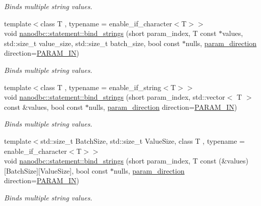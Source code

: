 \begin{DoxyCompactItemize}
\begin{DoxyCompactList}\small\item\em Binds multiple string values. \end{DoxyCompactList}\item 
{\footnotesize template$<$class T , typename  = enable\+\_\+if\+\_\+character$<$\+T$>$$>$ }\\void \mbox{\hyperlink{group__bind__strings_gadfdbae0cd7e7bf3737715bd32904438c}{nanodbc\+::statement\+::bind\+\_\+strings}} (short param\+\_\+index, T const $\ast$values, std\+::size\+\_\+t value\+\_\+size, std\+::size\+\_\+t batch\+\_\+size, bool const $\ast$nulls, \mbox{\hyperlink{classnanodbc_1_1statement_a523142f53cbbee8d68a074da993e7fa6}{param\+\_\+direction}} direction=\mbox{\hyperlink{classnanodbc_1_1statement_a523142f53cbbee8d68a074da993e7fa6ae33f42ce0677d00c291ff4d8e39f99de}{P\+A\+R\+A\+M\+\_\+\+IN}})
\begin{DoxyCompactList}\small\item\em Binds multiple string values. \end{DoxyCompactList}\item 
{\footnotesize template$<$class T , typename  = enable\+\_\+if\+\_\+string$<$\+T$>$$>$ }\\void \mbox{\hyperlink{group__bind__strings_ga7cc7255e38df32cedd8e50f86512a9a8}{nanodbc\+::statement\+::bind\+\_\+strings}} (short param\+\_\+index, std\+::vector$<$ T $>$ const \&values, bool const $\ast$nulls, \mbox{\hyperlink{classnanodbc_1_1statement_a523142f53cbbee8d68a074da993e7fa6}{param\+\_\+direction}} direction=\mbox{\hyperlink{classnanodbc_1_1statement_a523142f53cbbee8d68a074da993e7fa6ae33f42ce0677d00c291ff4d8e39f99de}{P\+A\+R\+A\+M\+\_\+\+IN}})
\begin{DoxyCompactList}\small\item\em Binds multiple string values. \end{DoxyCompactList}\item 
{\footnotesize template$<$std\+::size\+\_\+t Batch\+Size, std\+::size\+\_\+t Value\+Size, class T , typename  = enable\+\_\+if\+\_\+character$<$\+T$>$$>$ }\\void \mbox{\hyperlink{group__bind__strings_ga15d74df8689ffbc2543cd7453d32097b}{nanodbc\+::statement\+::bind\+\_\+strings}} (short param\+\_\+index, T const (\&values)\mbox{[}Batch\+Size\mbox{]}\mbox{[}Value\+Size\mbox{]}, bool const $\ast$nulls, \mbox{\hyperlink{classnanodbc_1_1statement_a523142f53cbbee8d68a074da993e7fa6}{param\+\_\+direction}} direction=\mbox{\hyperlink{classnanodbc_1_1statement_a523142f53cbbee8d68a074da993e7fa6ae33f42ce0677d00c291ff4d8e39f99de}{P\+A\+R\+A\+M\+\_\+\+IN}})
\begin{DoxyCompactList}\small\item\em Binds multiple string values. \end{DoxyCompactList}\end{DoxyCompactItemize}


